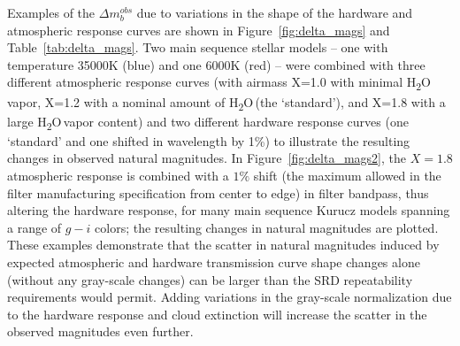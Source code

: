 \documentclass[12pt,preprint]{aastex}
\newcommand{\water}   {H\textsubscript{2}O}
\begin{document}
Examples of the $\Delta m_b^{obs}$ due to variations in the shape of
the hardware and atmospheric response curves are shown in
Figure~\ref{fig:delta_mags} and Table~\ref{tab:delta_mags}. Two main
sequence stellar models \citep{Kurucz1993} -- one with temperature
35000K (blue) and one 6000K (red) -- were combined with three
different atmospheric response curves (with airmass X=1.0 with minimal
\water\, vapor, X=1.2 with a nominal amount of \water\,(the
`standard'), and X=1.8 with a large \water\,vapor content) and two
different hardware response curves (one `standard' and one shifted in
wavelength by 1\%) to illustrate the resulting changes in observed
natural magnitudes. In Figure~\ref{fig:delta_mags2}, the $X=1.8$
atmospheric response is combined with a $1\%$ shift (the maximum
allowed in the filter manufacturing specification from center to edge)
in filter bandpass, thus altering the hardware response, for many main
sequence Kurucz models spanning a range of $g-i$ colors; the resulting
changes in natural magnitudes are plotted.  These examples demonstrate
that the scatter in natural magnitudes induced by expected atmospheric
and hardware transmission curve shape changes alone (without any
gray-scale changes) can be larger than the SRD repeatability
requirements would permit. Adding variations in the gray-scale
normalization due to the hardware response and cloud extinction will
increase the scatter in the observed magnitudes even further.
\end{document}
